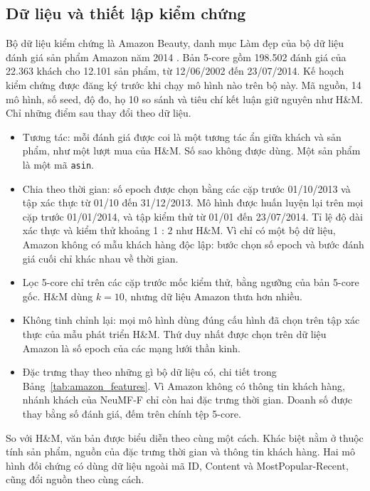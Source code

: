 \subsection{Dữ liệu và thiết lập kiểm chứng}
\label{subsec:amazon_data}

Bộ dữ liệu kiểm chứng là Amazon Beauty, danh mục Làm đẹp của bộ dữ liệu đánh giá sản phẩm Amazon năm 2014 \parencite{mcauley2015image}. Bản 5-core gồm 198.502 đánh giá của 22.363 khách cho 12.101 sản phẩm, từ 12/06/2002 đến 23/07/2014. Kế hoạch kiểm chứng được đăng ký trước khi chạy mô hình nào trên bộ này. Mã nguồn, 14 mô hình, số seed, độ đo, họ 10 so sánh và tiêu chí kết luận giữ nguyên như H\&M. Chỉ những điểm sau thay đổi theo dữ liệu.
\begin{itemize}
    \item Tương tác: mỗi đánh giá được coi là một tương tác ẩn giữa khách và sản phẩm, như một lượt mua của H\&M. Số sao không được dùng. Một sản phẩm là một mã \texttt{asin}.
    \item Chia theo thời gian: số epoch được chọn bằng các cặp trước 01/10/2013 và tập xác thực từ 01/10 đến 31/12/2013. Mô hình được huấn luyện lại trên mọi cặp trước 01/01/2014, và tập kiểm thử từ 01/01 đến 23/07/2014. Tỉ lệ độ dài xác thực và kiểm thử khoảng 1 : 2 như H\&M. Vì chỉ có một bộ dữ liệu, Amazon không có mẫu khách hàng độc lập: bước chọn số epoch và bước đánh giá cuối chỉ khác nhau về thời gian.
    \item Lọc 5-core chỉ trên các cặp trước mốc kiểm thử, bằng ngưỡng của bản 5-core gốc. H\&M dùng $k = 10$, nhưng dữ liệu Amazon thưa hơn nhiều.
    \item Không tinh chỉnh lại: mọi mô hình dùng đúng cấu hình đã chọn trên tập xác thực của mẫu phát triển H\&M. Thứ duy nhất được chọn trên dữ liệu Amazon là số epoch của các mạng lưới thần kinh.
    \item Đặc trưng thay theo những gì bộ dữ liệu có, chi tiết trong Bảng~\ref{tab:amazon_features}. Vì Amazon không có thông tin khách hàng, nhánh khách của NeuMF-F chỉ còn hai đặc trưng thời gian. Doanh số được thay bằng số đánh giá, đếm trên chính tệp 5-core.
\end{itemize}

So với H\&M, văn bản được biểu diễn theo cùng một cách. Khác biệt nằm ở thuộc tính sản phẩm, nguồn của đặc trưng thời gian và thông tin khách hàng. Hai mô hình đối chứng có dùng dữ liệu ngoài mã ID, Content và MostPopular-Recent, cũng đổi nguồn theo cùng cách.

